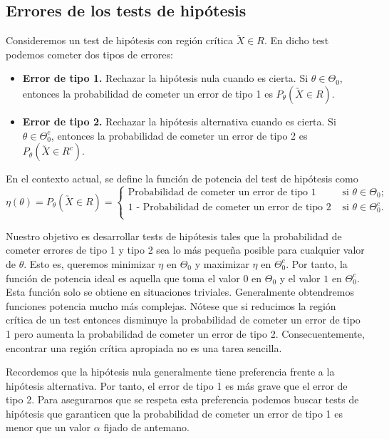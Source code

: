     \subsection{Errores de los tests de hipótesis}

        Consideremos un test de hipótesis con región crítica $\utilde{X} \in R$. En dicho test podemos cometer dos tipos de errores:

        \begin{itemize}
            \item \textbf{Error de tipo 1.} Rechazar la hipótesis nula cuando es cierta. Si $\theta \in \Theta_0$, entonces la probabilidad de cometer un error de tipo 1 es $P_\theta(\utilde{X} \in R)$.
            \item \textbf{Error de tipo 2.} Rechazar la hipótesis alternativa cuando es cierta. Si $\theta \in \Theta_0^c$, entonces la probabilidad de cometer un error de tipo 2 es $P_\theta(\utilde{X} \in R^c)$.
        \end{itemize}

        \begin{definition}
            En el contexto actual, se define la función de potencia del test de hipótesis como
            \[\eta(\theta) = P_\theta(\utilde{X} \in R) = \begin{cases} \text{Probabilidad de cometer un error de tipo 1} & \text{ si } \theta \in \Theta_0; \\ \text{1 - Probabilidad de cometer un error de tipo 2} & \text{ si } \theta \in \Theta_0^c. \\ \end{cases}\]
        \end{definition}

        Nuestro objetivo es desarrollar tests de hipótesis tales que la probabilidad de cometer errores de tipo 1 y tipo 2 sea lo más pequeña posible para cualquier valor de $\theta$. Esto es, queremos minimizar $\eta$ en $\Theta_0$ y maximizar $\eta$ en $\Theta_0^c$. Por tanto, la función de potencia ideal es aquella que toma el valor $0$ en $\Theta_0$ y el valor $1$ en $\Theta_0^c$. Esta función solo se obtiene en situaciones triviales. Generalmente obtendremos funciones potencia mucho más complejas. Nótese que si reducimos la región crítica de un test entonces disminuye la probabilidad de cometer un error de tipo 1 pero aumenta la probabilidad de cometer un error de tipo 2. Consecuentemente, encontrar una región crítica apropiada no es una tarea sencilla.

        Recordemos que la hipótesis nula generalmente tiene preferencia frente a la hipótesis alternativa. Por tanto, el error de tipo 1 es más grave que el error de tipo 2. Para asegurarnos que se respeta esta preferencia podemos buscar tests de hipótesis que garanticen que la probabilidad de cometer un error de tipo 1 es menor que un valor $\alpha$ fijado de antemano.

